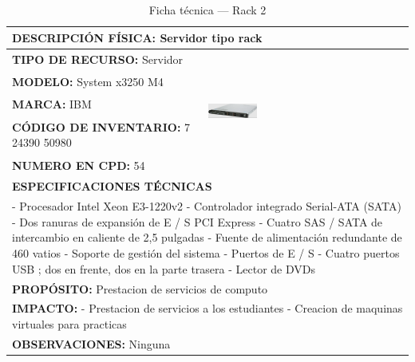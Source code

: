 \begin{table}[H]
\centering
\caption{Ficha técnica --- Rack 2}
\label{tab:rack-2}
\begin{tabular}{|p{}|p{}|}
\hline
\multicolumn{2}{|l|}{\textbf{DESCRIPCIÓN FÍSICA:} Servidor tipo rack} \\ \hline
\textbf{TIPO DE RECURSO:} Servidor & 
\multirow{5}{*}{\includegraphics[width=0.25\textwidth,height=4cm,keepaspectratio]{tablas-images/cp1/racks/rack-1.png}} \\ \cline{1-1}
\textbf{MODELO:} System x3250 M4 & \\ \cline{1-1}
\textbf{MARCA:} IBM & \\ \cline{1-1}
\textbf{CÓDIGO DE INVENTARIO:} 7 24390 50980 & \\ \cline{1-1}
\textbf{NUMERO EN CPD:} 54 & \\ \hline
\multicolumn{2}{|l|}{\textbf{ESPECIFICACIONES TÉCNICAS}} \\ \hline
\multicolumn{2}{|p{0.95\textwidth}|}{
\footnotesize
- Procesador Intel Xeon E3-1220v2
- Controlador integrado Serial-ATA (SATA)
- Dos ranuras de expansión de E / S PCI Express
- Cuatro SAS / SATA de intercambio en caliente de 2,5 pulgadas
- Fuente de alimentación redundante de 460 vatios
- Soporte de gestión del sistema
- Puertos de E / S
- Cuatro puertos USB ; dos en frente, dos en la parte trasera
- Lector de DVDs
} \\ \hline
\multicolumn{2}{|l|}{\textbf{PROPÓSITO:} Prestacion de servicios de computo} \\ \hline
\multicolumn{2}{|p{0.9\textwidth}|}{\textbf{IMPACTO:} - Prestacion de servicios a los estudiantes
- Creacion de maquinas virtuales para practicas} \\ \hline
\multicolumn{2}{|p{0.9\textwidth}|}{\textbf{OBSERVACIONES:}  Ninguna} \\ \hline
\end{tabular}
\end{table}

